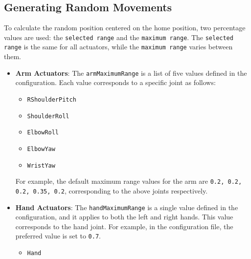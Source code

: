 \documentclass{CSSRforAfrica}
\begin{document}
\subsection*{Generating Random Movements}
\label{sec:math_random_movements}
To calculate the random position centered on the home position, two percentage values are used: the \texttt{selected range} and the \texttt{maximum range}. The \texttt{selected range} is the same for all actuators, while the \texttt{maximum range} varies between them.\\
\begin{itemize}
    \item \textbf{Arm Actuators}: The \texttt{armMaximumRange} is a list of five values defined in the configuration. Each value corresponds to a specific joint as follows:
    \begin{itemize}
        \item \texttt{RShoulderPitch}
        \item \texttt{ShoulderRoll}
        \item \texttt{ElbowRoll}
        \item \texttt{ElbowYaw}
        \item \texttt{WristYaw}
    \end{itemize}
    For example, the default maximum range values for the arm are \texttt{0.2, 0.2, 0.2, 0.35, 0.2}, corresponding to the above joints respectively.

    \item \textbf{Hand Actuators}: The \texttt{handMaximumRange} is a single value defined in the configuration, and it applies to both the left and right hands. This value corresponds to the hand joint. For example, in the configuration file, the preferred value is set to \texttt{0.7}.
 
    \begin{itemize}
        \item \texttt{Hand}
    \end{itemize}


\end{itemize}
\end{document}
